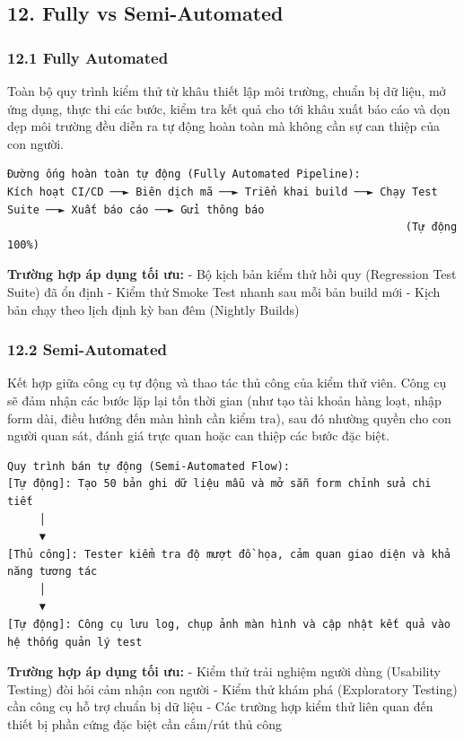\subsection{12. Fully vs Semi-Automated}

\subsubsection{12.1 Fully Automated}

Toàn bộ quy trình kiểm thử từ khâu thiết lập môi trường, chuẩn bị dữ liệu, mở ứng dụng, thực thi các bước, kiểm tra kết quả cho tới khâu xuất báo cáo và dọn dẹp môi trường đều diễn ra tự động hoàn toàn mà không cần sự can thiệp của con người.

\begin{lstlisting}
Đường ống hoàn toàn tự động (Fully Automated Pipeline):
Kích hoạt CI/CD ──► Biên dịch mã ──► Triển khai build ──► Chạy Test Suite ──► Xuất báo cáo ──► Gửi thông báo
                                                              (Tự động 100%)
\end{lstlisting}


\textbf{Trường hợp áp dụng tối ưu:}
- Bộ kịch bản kiểm thử hồi quy (Regression Test Suite) đã ổn định
- Kiểm thử Smoke Test nhanh sau mỗi bản build mới
- Kịch bản chạy theo lịch định kỳ ban đêm (Nightly Builds)

\subsubsection{12.2 Semi-Automated}

Kết hợp giữa công cụ tự động và thao tác thủ công của kiểm thử viên. Công cụ sẽ đảm nhận các bước lặp lại tốn thời gian (như tạo tài khoản hàng loạt, nhập form dài, điều hướng đến màn hình cần kiểm tra), sau đó nhường quyền cho con người quan sát, đánh giá trực quan hoặc can thiệp các bước đặc biệt.

\begin{lstlisting}
Quy trình bán tự động (Semi-Automated Flow):
[Tự động]: Tạo 50 bản ghi dữ liệu mẫu và mở sẵn form chỉnh sửa chi tiết
     │
     ▼
[Thủ công]: Tester kiểm tra độ mượt đồ họa, cảm quan giao diện và khả năng tương tác
     │
     ▼
[Tự động]: Công cụ lưu log, chụp ảnh màn hình và cập nhật kết quả vào hệ thống quản lý test
\end{lstlisting}


\textbf{Trường hợp áp dụng tối ưu:}
- Kiểm thử trải nghiệm người dùng (Usability Testing) đòi hỏi cảm nhận con người
- Kiểm thử khám phá (Exploratory Testing) cần công cụ hỗ trợ chuẩn bị dữ liệu
- Các trường hợp kiểm thử liên quan đến thiết bị phần cứng đặc biệt cần cắm/rút thủ công


